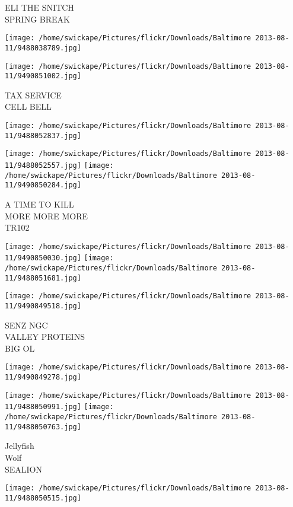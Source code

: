 \documentclass[10pt,letterpaper]{article}
\begin{document}
ELI THE SNITCH\\
SPRING BREAK
\pagebreak

\texttt{[image: /home/swickape/Pictures/flickr/Downloads/Baltimore 2013-08-11/9488038789.jpg]}

\vspace{0.25in}
\texttt{[image: /home/swickape/Pictures/flickr/Downloads/Baltimore 2013-08-11/9490851002.jpg]}

TAX SERVICE\\
CELL BELL
\pagebreak

\texttt{[image: /home/swickape/Pictures/flickr/Downloads/Baltimore 2013-08-11/9488052837.jpg]}

\vspace{0.25in}
\texttt{[image: /home/swickape/Pictures/flickr/Downloads/Baltimore 2013-08-11/9488052557.jpg]}
\texttt{[image: /home/swickape/Pictures/flickr/Downloads/Baltimore 2013-08-11/9490850284.jpg]}

A TIME TO KILL\\
MORE MORE MORE\\
TR102
\pagebreak

\texttt{[image: /home/swickape/Pictures/flickr/Downloads/Baltimore 2013-08-11/9490850030.jpg]}
\texttt{[image: /home/swickape/Pictures/flickr/Downloads/Baltimore 2013-08-11/9488051681.jpg]}

\vspace{0.25in}
\texttt{[image: /home/swickape/Pictures/flickr/Downloads/Baltimore 2013-08-11/9490849518.jpg]}

SENZ NGC\\
VALLEY PROTEINS\\
BIG OL
\pagebreak

\texttt{[image: /home/swickape/Pictures/flickr/Downloads/Baltimore 2013-08-11/9490849278.jpg]}

\vspace{0.25in}
\texttt{[image: /home/swickape/Pictures/flickr/Downloads/Baltimore 2013-08-11/9488050991.jpg]}
\texttt{[image: /home/swickape/Pictures/flickr/Downloads/Baltimore 2013-08-11/9488050763.jpg]}

Jellyfish\\
Wolf\\
SEALION
\pagebreak

\texttt{[image: /home/swickape/Pictures/flickr/Downloads/Baltimore 2013-08-11/9488050515.jpg]}
\end{document}
